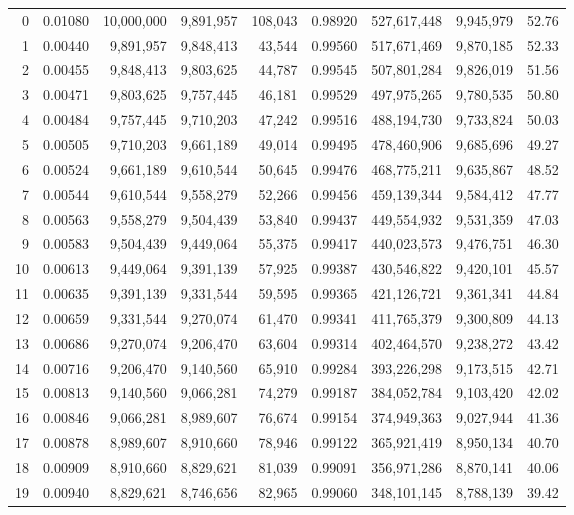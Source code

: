 \begin{longtable}{rrrrrrrrr}
0 & 0.01080 & 10,000,000 & 9,891,957 & 108,043 & 0.98920 & 527,617,448 & 9,945,979 & 52.76 \\
1 & 0.00440 & 9,891,957 & 9,848,413 & 43,544 & 0.99560 & 517,671,469 & 9,870,185 & 52.33 \\
2 & 0.00455 & 9,848,413 & 9,803,625 & 44,787 & 0.99545 & 507,801,284 & 9,826,019 & 51.56 \\
3 & 0.00471 & 9,803,625 & 9,757,445 & 46,181 & 0.99529 & 497,975,265 & 9,780,535 & 50.80 \\
4 & 0.00484 & 9,757,445 & 9,710,203 & 47,242 & 0.99516 & 488,194,730 & 9,733,824 & 50.03 \\
5 & 0.00505 & 9,710,203 & 9,661,189 & 49,014 & 0.99495 & 478,460,906 & 9,685,696 & 49.27 \\
6 & 0.00524 & 9,661,189 & 9,610,544 & 50,645 & 0.99476 & 468,775,211 & 9,635,867 & 48.52 \\
7 & 0.00544 & 9,610,544 & 9,558,279 & 52,266 & 0.99456 & 459,139,344 & 9,584,412 & 47.77 \\
8 & 0.00563 & 9,558,279 & 9,504,439 & 53,840 & 0.99437 & 449,554,932 & 9,531,359 & 47.03 \\
9 & 0.00583 & 9,504,439 & 9,449,064 & 55,375 & 0.99417 & 440,023,573 & 9,476,751 & 46.30 \\
10 & 0.00613 & 9,449,064 & 9,391,139 & 57,925 & 0.99387 & 430,546,822 & 9,420,101 & 45.57 \\
11 & 0.00635 & 9,391,139 & 9,331,544 & 59,595 & 0.99365 & 421,126,721 & 9,361,341 & 44.84 \\
12 & 0.00659 & 9,331,544 & 9,270,074 & 61,470 & 0.99341 & 411,765,379 & 9,300,809 & 44.13 \\
13 & 0.00686 & 9,270,074 & 9,206,470 & 63,604 & 0.99314 & 402,464,570 & 9,238,272 & 43.42 \\
14 & 0.00716 & 9,206,470 & 9,140,560 & 65,910 & 0.99284 & 393,226,298 & 9,173,515 & 42.71 \\
15 & 0.00813 & 9,140,560 & 9,066,281 & 74,279 & 0.99187 & 384,052,784 & 9,103,420 & 42.02 \\
16 & 0.00846 & 9,066,281 & 8,989,607 & 76,674 & 0.99154 & 374,949,363 & 9,027,944 & 41.36 \\
17 & 0.00878 & 8,989,607 & 8,910,660 & 78,946 & 0.99122 & 365,921,419 & 8,950,134 & 40.70 \\
18 & 0.00909 & 8,910,660 & 8,829,621 & 81,039 & 0.99091 & 356,971,286 & 8,870,141 & 40.06 \\
19 & 0.00940 & 8,829,621 & 8,746,656 & 82,965 & 0.99060 & 348,101,145 & 8,788,139 & 39.42 \\

\end{longtable}

